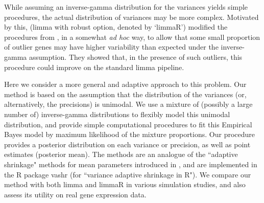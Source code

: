 \documentclass{bioinfo}
\begin{document}
While assuming an inverse-gamma distribution for the variances yields simple procedures, the actual distribution of variances may be more complex.
Motivated by this, \citet{phipson2013} (limma with robust option, denoted by `limmaR') modified the procedures from \citet{smyth2004limma},
in a somewhat {\it ad hoc} way, to allow that
some small proportion of outlier genes may have higher variability than expected under the inverse-gamma assumption. They showed that, in the presence
of such outliers, this procedure could improve on the standard limma pipeline.

Here we consider a more general and adaptive approach to this problem. Our method is based on the assumption that the distribution of the variances (or,
alternatively, the precisions) is unimodal. We use a mixture of (possibly a large number of) inverse-gamma distributions to flexibly model this unimodal distribution,
and provide simple computational procedures to fit this Empirical Bayes model by maximum likelihood of the mixture proportions.
Our procedure provides a posterior distribution on each variance or precision, as well as point estimates (posterior mean). The methods
are an analogue of the ``adaptive shrinkage" methods for mean parameters introduced in \citet{stephens2016ash}, and are implemented in
the R package vashr (for ``variance adaptive shrinkage in R"). We compare our method with both limma and limmaR in various simulation studies, and also 
assess its utility on real gene expression data.
\end{document}
